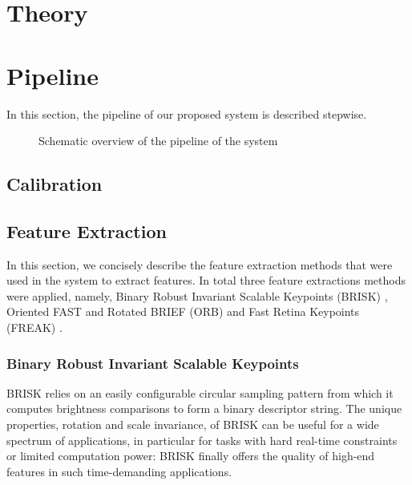 \documentclass[a4paper]{article}
\begin{document}
\section{Theory}

\section{Pipeline}
In this section, the pipeline of our proposed system is described stepwise.

\begin{figure}[!hb]
\caption{Schematic overview of the pipeline of the system}
\label{fig:system}
\end{figure}

\subsection{Calibration}
\subsection{Feature Extraction}
In this section, we concisely describe the feature extraction methods that were used in the system to extract features. In total three feature extractions methods were applied, namely, Binary Robust Invariant Scalable Keypoints (BRISK) \cite{Leutenegger2011}, Oriented FAST and Rotated BRIEF (ORB) \cite{Rublee2011} and Fast Retina Keypoints (FREAK) \cite{Ortiz2012}.

\subsubsection{Binary Robust Invariant Scalable Keypoints}
BRISK relies on an easily conﬁgurable circular sampling pattern from which it computes brightness comparisons to form a binary descriptor string. The unique properties, rotation and scale invariance, of BRISK can be useful for a wide spectrum of applications, in particular for tasks with hard real-time constraints or limited computation power: BRISK ﬁnally offers the quality of high-end features in such time-demanding applications.
\end{document}
